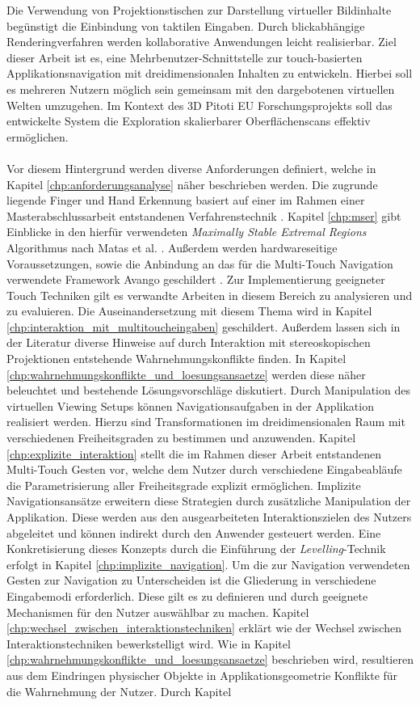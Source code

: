 Die Verwendung von Projektionstischen zur Darstellung virtueller Bildinhalte begünstigt die Einbindung von taktilen Eingaben. Durch blickabhängige Renderingverfahren werden kollaborative Anwendungen leicht realisierbar. Ziel dieser Arbeit ist es, eine Mehrbenutzer-Schnittstelle zur touch-basierten Applikationsnavigation mit dreidimensionalen Inhalten zu entwickeln. Hierbei soll es mehreren Nutzern möglich sein gemeinsam mit den dargebotenen virtuellen Welten umzugehen. Im Kontext des 3D Pitoti EU Forschungsprojekts soll das entwickelte System die Exploration skalierbarer Oberflächenscans effektiv ermöglichen.
\\\\
Vor diesem Hintergrund werden diverse Anforderungen definiert, welche in Kapitel \ref{chp:anforderungsanalyse} näher beschrieben werden. Die zugrunde liegende Finger und Hand Erkennung basiert auf einer im Rahmen einer Masterabschlussarbeit entstandenen Verfahrenstechnik \cite{ewerling:2012}. Kapitel \ref{chp:mser} gibt Einblicke in den hierfür verwendeten \emph{Maximally Stable Extremal Regions} Algorithmus nach Matas et al. \cite{matas:2004}. Außerdem werden hardwareseitige Voraussetzungen, sowie die Anbindung an das für die Multi-Touch Navigation verwendete Framework Avango geschildert \cite{avango:2011}. Zur Implementierung geeigneter Touch Techniken gilt es verwandte Arbeiten in diesem Bereich zu analysieren und zu evaluieren. Die Auseinandersetzung mit diesem Thema wird in Kapitel \ref{chp:interaktion_mit_multitoucheingaben} geschildert. Außerdem lassen sich in der Literatur diverse Hinweise auf durch Interaktion mit stereoskopischen Projektionen entstehende Wahrnehmungskonflikte finden. In Kapitel \ref{chp:wahrnehmungskonflikte_und_loesungsansaetze} werden diese näher beleuchtet und bestehende Lösungsvorschläge diskutiert. Durch Manipulation des virtuellen Viewing Setups können Navigationsaufgaben in der Applikation realisiert werden. Hierzu sind Transformationen im dreidimensionalen Raum mit verschiedenen Freiheitsgraden zu bestimmen und anzuwenden. Kapitel \ref{chp:explizite_interaktion} stellt die im Rahmen dieser Arbeit entstandenen Multi-Touch Gesten vor, welche dem Nutzer durch verschiedene Eingabeabläufe die Parametrisierung aller Freiheitsgrade explizit ermöglichen. Implizite Navigationsansätze erweitern diese Strategien durch zusätzliche Manipulation der Applikation. Diese werden aus den ausgearbeiteten Interaktionszielen des Nutzers abgeleitet und können indirekt durch den Anwender gesteuert werden. Eine Konkretisierung dieses Konzepts durch die Einführung der \emph{Levelling}-Technik erfolgt in Kapitel \ref{chp:implizite_navigation}. Um die zur Navigation verwendeten Gesten zur Navigation zu Unterscheiden ist die Gliederung in verschiedene Eingabemodi erforderlich. Diese gilt es zu definieren und durch geeignete Mechanismen für den Nutzer auswählbar zu machen. Kapitel \ref{chp:wechsel_zwischen_interaktionstechniken} erklärt wie der Wechsel zwischen Interaktionstechniken bewerkstelligt wird. Wie in Kapitel \ref{chp:wahrnehmungskonflikte_und_loesungsansaetze} beschrieben wird, resultieren aus dem Eindringen physischer Objekte in Applikationsgeometrie Konflikte für die Wahrnehmung der Nutzer. Durch Kapitel 